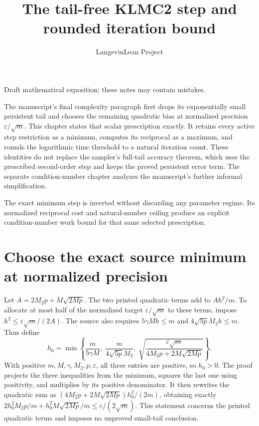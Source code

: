 \documentclass[11pt,a4paper]{article}
\title{\texorpdfstring{The tail-free KLMC2 step and rounded iteration bound}{The tail-free KLMC2 step and rounded iteration bound}}
\author{LangevinLean Project}
\date{}
\begin{document}
\maketitle
Draft mathematical exposition; these notes may contain mistakes.


The manuscript's final complexity paragraph first drops its exponentially small persistent tail and chooses the remaining quadratic bias at normalized precision \(\varepsilon/\sqrt m\). This chapter states that scalar prescription exactly. It retains every active step restriction as a minimum, computes its reciprocal as a maximum, and rounds the logarithmic time threshold to a natural iteration count. These identities do not replace the sampler's full-tail accuracy theorem, which uses the prescribed second-order step and keeps the proved persistent error term. The separate condition-number chapter analyzes the manuscript's further informal simplification.



The exact minimum step is inverted without discarding any parameter regime. Its normalized reciprocal cost and natural-number ceiling produce an explicit condition-number work bound for that same selected prescription.


\section{\texorpdfstring{Choose the exact source minimum at normalized precision}{Choose the exact source minimum at normalized precision}}


Let \(A=2M_2p+M\sqrt{2Mp}\). The two printed quadratic terms add to \(A h^2/m\). To allocate at most half of the normalized target \(\varepsilon/\sqrt m\) to these terms, impose \(h^2\le\varepsilon\sqrt m/(2A)\). The source also requires \(5\gamma Mh\le m\) and \(4\sqrt{5p}M_2h\le m\). Thus define \[h_0=\min\!\left\{\frac{m}{5\gamma M},\;\frac{m}{4\sqrt{5p}M_2},\;\sqrt{\frac{\varepsilon\sqrt m}{4M_2p+2M\sqrt{2Mp}}}\right\}.\] With positive \(m,M,\gamma,M_2,p,\varepsilon\), all three entries are positive, so \(h_0>0\). The proof projects the three inequalities from the minimum, squares the last one using positivity, and multiplies by its positive denominator. It then rewrites the quadratic sum as \((4M_2p+2M\sqrt{2Mp})h_0^2/(2m)\), obtaining exactly \(2h_0^2M_2p/m+h_0^2M\sqrt{2Mp}/m\le\varepsilon/(2\sqrt m)\). This statement concerns the printed quadratic terms and imposes no unproved small-tail conclusion.
\end{document}
